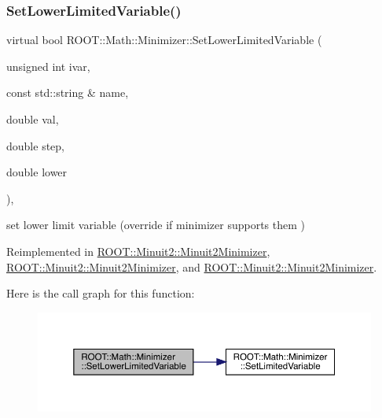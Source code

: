 \mbox{\label{classROOT_1_1Math_1_1Minimizer_a0fed20bdc58d05ce2b92d2bf47594dfb}} 
\subsubsection{\texorpdfstring{SetLowerLimitedVariable()}{SetLowerLimitedVariable()}\hspace{0.1cm}{\footnotesize\ttfamily [1/3]}}
{\footnotesize\ttfamily virtual bool R\+O\+O\+T\+::\+Math\+::\+Minimizer\+::\+Set\+Lower\+Limited\+Variable (\begin{DoxyParamCaption}\item[{unsigned int}]{ivar,  }\item[{const std\+::string \&}]{name,  }\item[{double}]{val,  }\item[{double}]{step,  }\item[{double}]{lower }\end{DoxyParamCaption})\hspace{0.3cm}{\ttfamily [inline]}, {\ttfamily [virtual]}}



set lower limit variable (override if minimizer supports them ) 



Reimplemented in \mbox{\hyperlink{classROOT_1_1Minuit2_1_1Minuit2Minimizer_af38926946e36f7030cfc1c298ab9b222}{R\+O\+O\+T\+::\+Minuit2\+::\+Minuit2\+Minimizer}}, \mbox{\hyperlink{classROOT_1_1Minuit2_1_1Minuit2Minimizer_af38926946e36f7030cfc1c298ab9b222}{R\+O\+O\+T\+::\+Minuit2\+::\+Minuit2\+Minimizer}}, and \mbox{\hyperlink{classROOT_1_1Minuit2_1_1Minuit2Minimizer_af38926946e36f7030cfc1c298ab9b222}{R\+O\+O\+T\+::\+Minuit2\+::\+Minuit2\+Minimizer}}.

Here is the call graph for this function\+:
\nopagebreak
\begin{figure}[H]
\begin{center}
\leavevmode
\includegraphics[width=350pt]{dc/dc4/classROOT_1_1Math_1_1Minimizer_a0fed20bdc58d05ce2b92d2bf47594dfb_cgraph}
\end{center}
\end{figure}
\mbox{\label{classROOT_1_1Math_1_1Minimizer_a0fed20bdc58d05ce2b92d2bf47594dfb}} 
